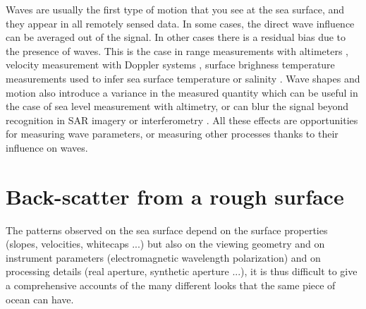 



Waves are usually the first type of motion that you see at the sea surface, and they appear in all remotely sensed data. In some cases, the direct wave influence can be averaged out of the signal. In other cases there is a residual bias due to the presence of waves. This is the case in 
range measurements with altimeters \citep[e.g.][]{Minster&al.1992}, velocity measurement with Doppler systems
\citep{Chapron&al.2005,Nouguier&al.2018}, surface brighness temperature measurements used to infer 
sea surface temperature or salinity \citep{Reul&Chapron2003}. Wave shapes and motion also introduce a variance in the 
measured quantity which can be useful in the case of sea level measurement with altimetry, or can blur 
the signal beyond recognition in SAR imagery or interferometry \citep{Peral&al.2015}. All these effects are opportunities for measuring wave parameters, or measuring other processes thanks to their influence on waves. 

\section{Back-scatter from a rough surface}
The patterns observed on the sea surface depend on the surface properties (slopes, velocities, whitecaps ...) but also on the viewing geometry and on instrument parameters (electromagnetic wavelength polarization) and on processing details (real aperture, synthetic aperture ...), it is thus difficult to give a comprehensive accounts of the many different looks that the same piece of ocean can have. 


